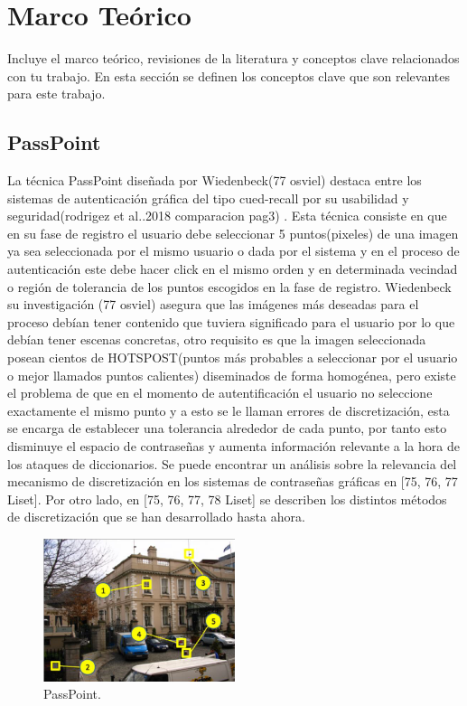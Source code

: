 \documentclass[12pt]{report}
\begin{document}
	
	

\setcounter{chapter}{0}
\chapter{Marco Teórico}
Incluye el marco teórico, revisiones de la literatura y conceptos clave relacionados con tu trabajo.
En esta sección se definen los conceptos clave que son relevantes para este trabajo. 

\section{PassPoint}
	La técnica PassPoint diseñada por Wiedenbeck(77 osviel) destaca entre los sistemas de autenticación gráfica del tipo cued-recall por su usabilidad y seguridad(rodrigez et al..2018 comparacion pag3) .
	Esta técnica consiste en que  en su fase de registro el
	usuario debe seleccionar 5 puntos(pixeles) de una imagen ya sea seleccionada por el mismo usuario o dada por el sistema  y en el proceso de autenticación este debe hacer click en el mismo orden y en determinada  vecindad o región de tolerancia de los puntos escogidos en la fase de registro.
	Wiedenbeck su investigación (77 osviel) asegura que las imágenes más deseadas para el proceso debían tener contenido que tuviera significado para el usuario por lo que debían tener escenas concretas, otro requisito es que la imagen seleccionada posean cientos de HOTSPOST(puntos más probables a seleccionar por el usuario o mejor llamados puntos calientes) diseminados de forma homogénea, pero existe el problema de que en el momento de autentificación el usuario no seleccione exactamente el mismo punto y a esto se le llaman errores de discretización, esta se encarga de establecer una tolerancia alrededor de cada punto, por tanto esto disminuye el espacio de contraseñas y aumenta información relevante a la hora de los ataques de diccionarios. Se puede encontrar un análisis sobre la relevancia del mecanismo de discretización en los sistemas de contraseñas gráficas en [75, 76, 77 Liset]. Por otro lado, en [75, 76, 77, 78 Liset] se describen los distintos métodos de discretización que se han desarrollado hasta ahora.\\
	\begin{figure}[ht]
		\centering
		\includegraphics[width=0.5\textwidth]{passpoint.png}
		\caption{PassPoint.}
		\label{fig:PassPoint}
	\end{figure}
	
\end{document}
